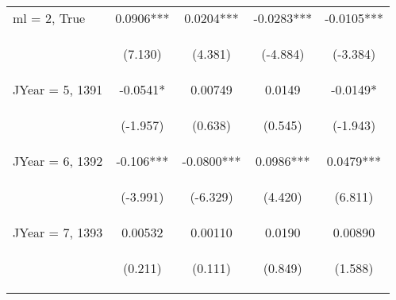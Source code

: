 \documentclass[]{article}
\begin{document}
\begin{center}
\begin{tabular}{lcccc}
ml = 2, True & 0.0906*** & 0.0204*** & -0.0283*** & -0.0105*** \\
\vspace{4pt} & \begin{footnotesize}(7.130)\end{footnotesize} & \begin{footnotesize}(4.381)\end{footnotesize} & \begin{footnotesize}(-4.884)\end{footnotesize} & \begin{footnotesize}(-3.384)\end{footnotesize} \\
JYear = 5, 1391 & -0.0541* & 0.00749 & 0.0149 & -0.0149* \\
\vspace{4pt} & \begin{footnotesize}(-1.957)\end{footnotesize} & \begin{footnotesize}(0.638)\end{footnotesize} & \begin{footnotesize}(0.545)\end{footnotesize} & \begin{footnotesize}(-1.943)\end{footnotesize} \\
JYear = 6, 1392 & -0.106*** & -0.0800*** & 0.0986*** & 0.0479*** \\
\vspace{4pt} & \begin{footnotesize}(-3.991)\end{footnotesize} & \begin{footnotesize}(-6.329)\end{footnotesize} & \begin{footnotesize}(4.420)\end{footnotesize} & \begin{footnotesize}(6.811)\end{footnotesize} \\
JYear = 7, 1393 & 0.00532 & 0.00110 & 0.0190 & 0.00890 \\
\vspace{4pt} & \begin{footnotesize}(0.211)\end{footnotesize} & \begin{footnotesize}(0.111)\end{footnotesize} & \begin{footnotesize}(0.849)\end{footnotesize} & \begin{footnotesize}(1.588)\end{footnotesize} \\

\end{tabular}
\end{center}
\end{document}
